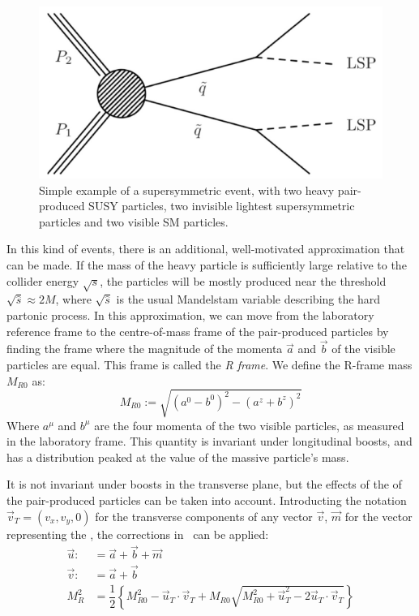 \begin{figure}[htb]
    \centering
    \includegraphics[width=.6\textwidth]{images/pdf/standard_razor_susy}
    \caption{Simple example of a supersymmetric event, with two heavy
    pair-produced SUSY particles, two invisible lightest supersymmetric
particles and two visible SM particles.}
    \label{fig:standard_razor_susy}
\end{figure}
In this kind of events, there is an additional, well-motivated approximation
that can be made. If the mass of the heavy particle is sufficiently large
relative to the collider energy $\sqrt{s}$, the particles will be mostly
produced near the threshold $\sqrt{\hat s} \approx 2M$, where
$\sqrt{\hat s}$ is the usual Mandelstam variable describing the hard
partonic process.
In this approximation, we can move from the laboratory reference frame to
the centre-of-mass frame of the pair-produced particles by finding the frame
where the magnitude of the momenta $\vec a$ and $\vec b$ of the visible particles are equal. This
frame is called the \emph{R frame}.
We define the R-frame mass $M_{R0}$ as:
\begin{equation*}
    M_{R0} \mathop:= \sqrt{(a^0 - b^0)^2 - (a^z + b^z)^2}
\end{equation*}
Where $a^\mu$ and $b^\mu$ are the four momenta of the two visible particles, as
measured in the laboratory frame.
This quantity is invariant under longitudinal boosts, and has a distribution
peaked at the value of the massive particle's mass.

It is not invariant under boosts in the transverse plane, but the
effects of the \pt of the pair-produced particles can be taken into account.
Introducting the notation $\vec{v}_T = (v_x, v_y, 0)$ for the transverse
components of any vector $\vec{v}$, $\vec m$ for the vector representing the
\met, the corrections in~\cite{chris_email}
can be applied:
\begin{align*}
    \vec u \mathop: &= \vec a + \vec b + \vec m\\
    \vec v \mathop: &= \vec a + \vec b\\
    M_R^2 &= \dfrac{1}{2}\left\{ M_{R0}^2  - \vec{u}_T \cdot \vec{v}_T 
    + M_{R0}\sqrt{M_{R0}^2 + \vec{u}_T^2 - 2\vec{u}_T \cdot \vec{v}_T}\right\}
\end{align*}

